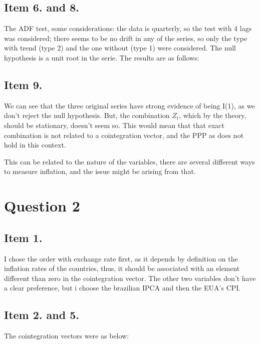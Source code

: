 \documentclass[12pt]{article}
\begin{document}
\subsection*{Item 6. and 8.}
The ADF test, some considerations: the data is quarterly, so the test with 4 lags was considered; there seems to be no drift in any of the series, so only the type with trend (type 2) and the one without (type 1) were considered. The null hypothesis is a unit root in the serie. The results are as follows:







\subsection*{Item 9.}
We can see that the three original series have strong evidence of being I(1), as we don't reject the null hypothesis. But, the combination $Z_t$, which by the theory, should be stationary, doesn't seem so. This would mean that that exact combination is not related to a cointegration vector, and the PPP as does not hold in this context.

This can be related to the nature of the variables, there are several different ways to measure inflation, and the issue might be arising from that.



\section*{Question 2}

\subsection*{Item 1.}
I chose the order with exchange rate first, as it depends by definition on the inflation rates of the countries, thus, it should be associated with an element different than zero in the cointegration vector. The other two variables don't have a clear preference, but i choose the brazilian IPCA and then the EUA's CPI.


\subsection*{Item 2. and 5.}
The cointegration vectors were as below:


\end{document}
